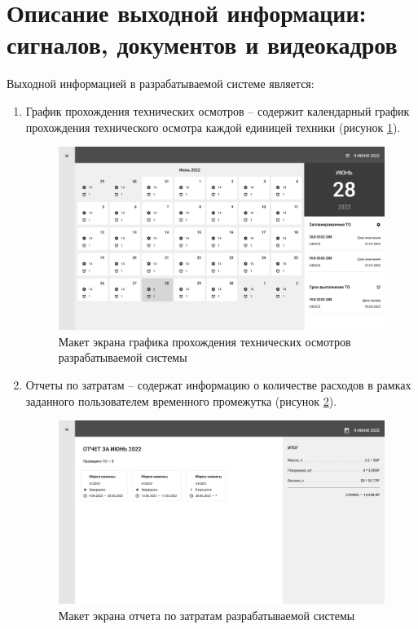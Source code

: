 \documentclass[../nirs.tex]{subfiles}
\begin{document}
\section{Описание выходной информации: сигналов, документов и видеокадров}
Выходной информацией в разрабатываемой системе является:

\begin{enumerate}

    \item График прохождения технических осмотров -- содержит календарный график
        прохождения технического осмотра каждой единицей техники (рисунок
        \ref{fig:design-calendar}).

        \begin{figure}[H]
        \centering
        \includegraphics[keepaspectratio,width=\textwidth]{./images/calendar-planning.png}
        \caption{Макет экрана графика прохождения технических осмотров
        разрабатываемой системы}
        \label{fig:design-calendar}
        \end{figure}

	\item Отчеты по затратам -- содержат информацию о количестве расходов в
		рамках заданного пользователем временного промежутка (рисунок
        \ref{fig:design-report}).

        \begin{figure}[H]
        \centering
        \includegraphics[keepaspectratio,width=\textwidth]{./images/expenses-report.png}
        \caption{Макет экрана отчета по затратам разрабатываемой системы}
        \label{fig:design-report}
        \end{figure}
\end{enumerate}
\end{document}
